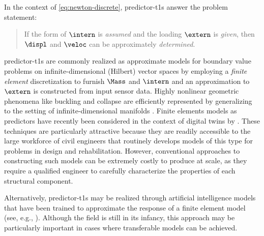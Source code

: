 In the context of \eqref{eq:newton-discrete}, \glspl{predictor-t1} answer the problem statement:
\begin{quote}
 If the form of $\intern$ is \emph{assumed} and the loading $\extern$ is \emph{given}, then $\displ$ and $\veloc$ can be approximately \emph{determined}.
\end{quote}
%
\glspl{predictor-t1} are commonly realized as approximate models for boundary value problems on infinite-dimensional (Hilbert) vector spaces by employing a \emph{finite element} discretization to furnish $\Mass$ and $\intern$ and an approximation to $\extern$ is constructed from input sensor data. 
Highly nonlinear geometric phenomena like buckling and collapse are efficiently represented by generalizing to the setting of infinite-dimensional manifolds \cite{perez2024nonlinear}.
Finite elements models as \glspl{predictor} have recently been considered in the context of digital twins by \cite{torzoni2024digital,ghahari2022bridge,chern2024brace2}. 
These techniques are particularly
attractive because they are readily
accessible to the large workforce of civil engineers that routinely develops models of
this type for problems in design and rehabilitation.
%
However, conventional approaches to constructing such models can be 
extremely costly to produce at scale, as they require a qualified engineer to carefully characterize the properties of each structural component.

Alternatively, \glspl{predictor-t1} may be realized through artificial intelligence models that have been trained to approximate the response of a finite element model (see, e.g.,  \cite{pang2024deep}). Although the field is still in its infancy, this approach may be particularly important in cases where transferable models can be achieved. %




